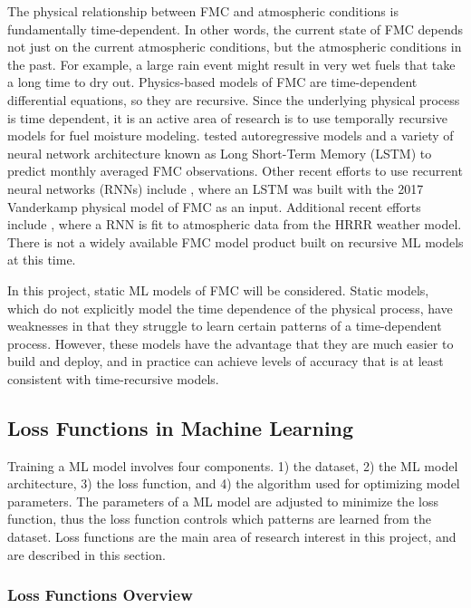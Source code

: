 \documentclass[11pt]{article}%
\begin{document}
The physical relationship between FMC and atmospheric conditions is fundamentally time-dependent. In other words, the current state of FMC depends not just on the current atmospheric conditions, but the atmospheric conditions in the past. For example, a large rain event might result in very wet fuels that take a long time to dry out. Physics-based models of FMC are time-dependent differential equations, so they are recursive. Since the underlying physical process is time dependent, it is an active area of research is to use temporally recursive models for fuel moisture modeling. \cite{Kang-2022-FMC} tested autoregressive models and a variety of neural network architecture known as Long Short-Term Memory (LSTM) to predict monthly averaged FMC observations. Other recent efforts to use recurrent neural networks (RNNs) include \cite{Fan-2021-PGD}, where an LSTM was built with the 2017 Vanderkamp physical model of FMC as an input. Additional recent efforts include \cite{Mandel-2023-BFM}, where a RNN is fit to atmospheric data from the HRRR weather model. There is not a widely available FMC model product built on recursive ML models at this time.

In this project, static ML models of FMC will be considered. Static models, which do not explicitly model the time dependence of the physical process, have weaknesses in that they struggle to learn certain patterns of a time-dependent process. However, these models have the advantage that they are much easier to build and deploy, and in practice can achieve levels of accuracy that is at least consistent with time-recursive models.

\subsection{Loss Functions in Machine Learning}

Training a ML model involves four components. 1) the dataset, 2) the ML model architecture, 3) the loss function, and 4) the algorithm used for optimizing model parameters. The parameters of a ML model are adjusted to minimize the loss function, thus the loss function controls which patterns are learned from the dataset. Loss functions are the main area of research interest in this project, and are described in this section.

\subsubsection{Loss Functions Overview}
\hfill
\end{document}
